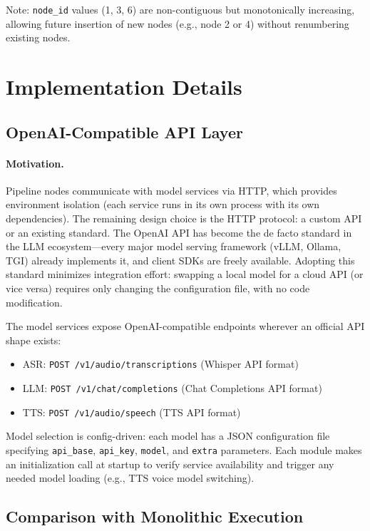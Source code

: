 \documentclass[11pt,a4paper]{article}
\begin{document}
Note: \texttt{node\_id} values (1, 3, 6) are non-contiguous but monotonically increasing, allowing future insertion of new nodes (e.g., node 2 or 4) without renumbering existing nodes.

\section{Implementation Details}
\label{app:details}

\subsection{OpenAI-Compatible API Layer}

\paragraph{Motivation.}
Pipeline nodes communicate with model services via HTTP, which provides environment isolation (each service runs in its own process with its own dependencies). The remaining design choice is the HTTP protocol: a custom API or an existing standard. The OpenAI API has become the de facto standard in the LLM ecosystem---every major model serving framework (vLLM, Ollama, TGI) already implements it, and client SDKs are freely available. Adopting this standard minimizes integration effort: swapping a local model for a cloud API (or vice versa) requires only changing the configuration file, with no code modification.

The model services expose OpenAI-compatible endpoints wherever an official API shape exists:
\begin{itemize}[nosep]
    \item ASR: \texttt{POST /v1/audio/transcriptions} (Whisper API format)
    \item LLM: \texttt{POST /v1/chat/completions} (Chat Completions API format)
    \item TTS: \texttt{POST /v1/audio/speech} (TTS API format)
\end{itemize}

Model selection is config-driven: each model has a JSON configuration file specifying \texttt{api\_base}, \texttt{api\_key}, \texttt{model}, and \texttt{extra} parameters. Each module makes an initialization call at startup to verify service availability and trigger any needed model loading (e.g., TTS voice model switching).

\subsection{Comparison with Monolithic Execution}
\end{document}
